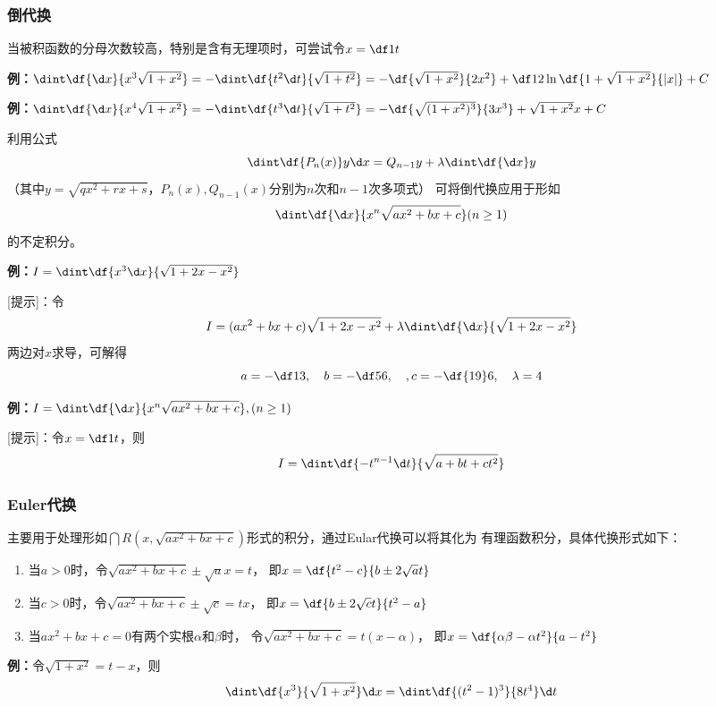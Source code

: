 \subsubsection{倒代换}

当被积函数的分母次数较高，特别是含有无理项时，可尝试令$x=\df 1t$

{\bf 例：}$\dint\df{\d x}{x^3\sqrt{1+x^2}}=-\dint\df{t^2\d t}{\sqrt{1+t^2}}
=-\df{\sqrt{1+x^2}}{2x^2}+\df12\ln\df{1+\sqrt{1+x^2}}{|x|}+C$

{\bf 例：}$\dint\df{\d x}{x^4\sqrt{1+x^2}}=-\dint\df{t^3\d t}{\sqrt{1+t^2}}
=-\df{\sqrt{(1+x^2)^3}}{3x^3}+\sqrt{1+x^2}x+C$

利用公式
$$\dint\df{P_n(x)}y\d x=Q_{n-1}y+\lambda\dint\df{\d x}y$$
（其中$y=\sqrt{qx^2+rx+s}$，$P_n(x),Q_{n-1}(x)$分别为$n$次和$n-1$次多项式）
可将倒代换应用于形如
$$\dint\df{\d x}{x^n\sqrt{ax^2+bx+c}}(n\geq1)$$
的不定积分。

{\bf 例：}$I=\dint\df{x^3\d x}{\sqrt{1+2x-x^2}}$

[提示]：令
$$I=(ax^2+bx+c)\sqrt{1+2x-x^2}+\lambda\dint\df{\d x}{\sqrt{1+2x-x^2}}$$
两边对$x$求导，可解得
$$a=-\df13,\quad b=-\df56,\quad,c=-\df{19}6,\quad\lambda=4$$

{\bf 例：}$I=\dint\df{\d x}{x^n\sqrt{ax^2+bx+c}},(n\geq 1)$

[提示]：令$x=\df 1t$，则
$$I=\dint\df{-t^{n-1}\d t}{\sqrt{a+bt+ct^2}}$$


\subsubsection{Euler代换}

主要用于处理形如$\dint R(x,\sqrt{ax^2+bx+c})$形式的积分，通过Eular代换可以将其化为
有理函数积分，具体代换形式如下：
\begin{enumerate}
  \setlength{\itemindent}{1cm}
  \item 当$a>0$时，令$\sqrt{ax^2+bx+c}\pm\sqrt ax=t$，
  即$x=\df{t^2-c}{b\pm2\sqrt at}$
  \item 当$c>0$时，令$\sqrt{ax^2+bx+c}\pm\sqrt c=tx$，
  即$x=\df{b\pm2\sqrt ct}{t^2-a}$
  \item 当$ax^2+bx+c=0$有两个实根$\alpha$和$\beta$时，
  令$\sqrt{ax^2+bx+c}=t(x-\alpha)$，
  即$x=\df{\alpha\beta-\alpha t^2}{a-t^2}$
\end{enumerate}

{\bf 例：}令$\sqrt{1+x^2}=t-x$，则
$$\dint\df{x^3}{\sqrt{1+x^2}}\d x=\dint\df{(t^2-1)^3}{8t^4}\d t$$

